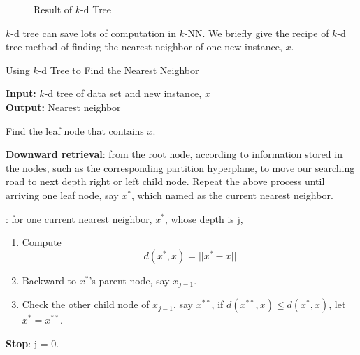     
	\begin{figure}[htbp]
	\caption{Result of $k$-d Tree}
	\label{alo:kdtree}
	\end{figure}







    
    $k$-d tree can save lots of computation in $k$-NN. We briefly give the recipe of $k$-d tree method of finding the nearest neighbor of one new instance, $x$.
    
    	 \begin{algorithm}
    	\caption{Using $k$-d Tree to Find the Nearest Neighbor}
    	\label{alo:kdtree}
    	\textbf{Input:} $k$-d tree of data set and new instance, $x$ \\
    	\textbf{Output:} Nearest neighbor

    	\begin{algorithmic}[1]
	\State Find the leaf node that contains $x$.
	
	\textbf{Downward retrieval}: from the root node, according to information stored in the nodes, such as the corresponding partition hyperplane, to move our searching road to next depth right or left child node. Repeat the above process until arriving one leaf node, say $x^{*}$, which named as the current nearest neighbor.
	
	: for one current nearest neighbor, $x^{*}$, whose depth is j,
	
	\begin{enumerate}[(1)]
	\item Compute 
	$$d(x^{*}, x) = ||x^{*} - x||$$
	\item Backward to $x^{*}$'s parent node, say $x_{j - 1}$. 
	\item Check the other child node of $x_{j - 1}$, say $x^{**}$, if $d(x^{**}, x) \leq d(x^{*}, x) $, let $x^{*} = x^{**}$.
	\end{enumerate}
	 
         \textbf{Stop}: j = 0. 
    	\end{algorithmic}
    \end{algorithm}
    
